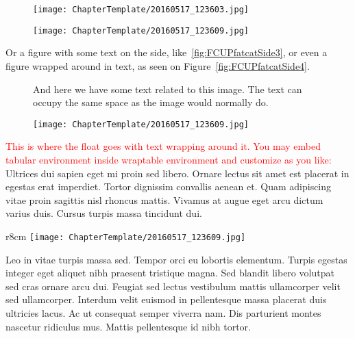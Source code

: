 \begin{figure}
\centering
\begin{minipage}{.49\textwidth}
  \centering
  \texttt{[image: ChapterTemplate/20160517\_123603.jpg]}
\end{minipage}%
\hfill
\begin{minipage}{.49\textwidth}
  \centering
  \texttt{[image: ChapterTemplate/20160517\_123609.jpg]}
\end{minipage}
\end{figure}


Or a figure with some text on the side, like~\ref{fig:FCUPfatcatSide3}, or even
a figure wrapped around in text, as seen on Figure~\ref{fig:FCUPfatcatSide4}.

\begin{figure}
\centering
\begin{minipage}{.49\textwidth}
  And here we have some text related to this image. The text can occupy the same space as the image would normally do.
\end{minipage}%
\hfill
\begin{minipage}{.49\textwidth}
  \centering
  \texttt{[image: ChapterTemplate/20160517\_123609.jpg]}
\end{minipage}
\end{figure}

\textcolor{red}{This is where the float goes with text wrapping around it. You
may embed tabular environment inside wraptable environment and customize as you
like:} Ultrices dui sapien eget mi proin sed libero. Ornare lectus sit amet est
placerat in egestas erat imperdiet. Tortor dignissim convallis aenean et. Quam
adipiscing vitae proin sagittis nisl rhoncus mattis. Vivamus at augue eget arcu
dictum varius duis. Cursus turpis massa tincidunt dui.
\begin{wrapfigure}{r}{8cm}
    \centering
    \texttt{[image: ChapterTemplate/20160517\_123609.jpg]}
  \end{wrapfigure}
Leo in vitae turpis massa sed. Tempor orci eu lobortis elementum. Turpis egestas
integer eget aliquet nibh praesent tristique magna. Sed blandit libero volutpat
sed cras ornare arcu dui. Feugiat sed lectus vestibulum mattis ullamcorper velit
sed ullamcorper. Interdum velit euismod in pellentesque massa placerat duis
ultricies lacus. Ac ut consequat semper viverra nam. Dis parturient montes
nascetur ridiculus mus. Mattis pellentesque id nibh tortor.

